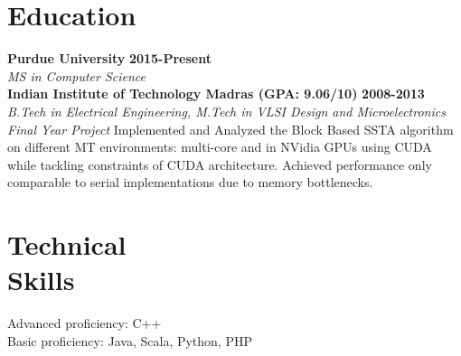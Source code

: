 \documentclass[margin,line]{resume}
\begin{document}
\begin{resume}

\section{\mysidestyle Education}
\textbf{Purdue University} \hfill \textbf{2015-Present} \\
\emph{MS in Computer Science}
    \vspace{2mm} \\
\textbf{Indian Institute of Technology Madras (GPA: 9.06/10) } \hfill \textbf{2008-2013} \\
\emph{B.Tech in Electrical Engineering, M.Tech in VLSI Design and Microelectronics} \\
\emph{Final Year Project} Implemented and Analyzed the Block Based SSTA algorithm on different MT environments:  multi-core and in NVidia GPUs using CUDA while tackling constraints of CUDA architecture. Achieved performance only comparable to serial implementations due to memory bottlenecks.

\section{\mysidestyle Technical \\ Skills} 
Advanced proficiency: C++ \\
Basic proficiency: Java, Scala, Python, PHP



\end{resume}
\end{document}

